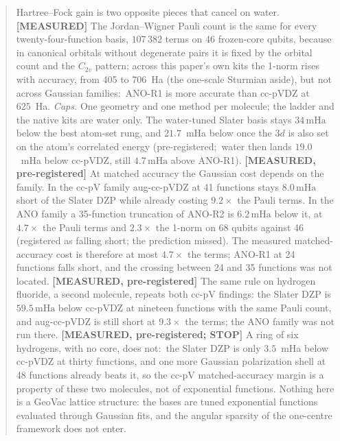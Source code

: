 \documentclass[aps,pra,twocolumn,superscriptaddress,longbibliography]{revtex4-2}
\newcommand{\gvq}[2]{#2}
\newcommand{\gvc}[2]{#2}
\newcommand{\mHa}{\,\mathrm{mHa}}
\begin{document}
\begin{abstract}
Hartree--Fock gain is two opposite pieces that cancel on water.
\textbf{[MEASURED]} The Jordan--Wigner Pauli count is the same for every
twenty-four-function basis, $\gvq{h2o_ccpvdz_pauli}{107\,382}$ terms on
46 frozen-core qubits, because in canonical orbitals without degenerate
pairs it is fixed by the orbital count and the $C_{2v}$ pattern; across
this paper's own kits the 1-norm rises with accuracy, from 405 to 706~Ha
(the one-scale Sturmian aside), but not across Gaussian families:\ ANO-R1
is more accurate than cc-pVDZ at 625~Ha.  \emph{Caps.}  One geometry and one method per molecule;
the ladder and the native kits are water only.
The water-tuned Slater basis stays $\gvq{p62_dzp_below_r5h_mha}{34}\mHa$
below the best atom-set rung, and $21.7$~mHa below once the $3d$ is also set
on the atom's correlated energy (pre-registered;\ water then lands $19.0$~mHa
below cc-pVDZ, still $\gvq{p62_r5h3d_above_anor1_mha}{4.7}\mHa$ above
ANO-R1).  \textbf{[MEASURED, pre-registered]} At matched accuracy the
Gaussian cost depends on the family.  In the cc-pV family aug-cc-pVDZ at
41 functions stays $\gvq{p62_aug_above_dzp_mha}{8.0}\mHa$ short of the
Slater DZP while already costing $\gvq{p62_aug_pauli_ratio}{9.2}\times$
the Pauli terms.  In the ANO family a 35-function truncation of ANO-R2
is $\gvq{p62_a35_below_dzp_mha}{6.2}\mHa$ below it, at
$\gvq{p62_a35_pauli_ratio}{4.7}\times$ the Pauli terms and
$\gvq{p62_a35_lambda_ratio}{2.3}\times$ the 1-norm on 68 qubits against
46 (registered as falling short; the prediction missed).  The measured
matched-accuracy cost is therefore at most $4.7\times$ the terms;
ANO-R1 at 24 functions falls short, and the crossing between 24 and 35
functions was not located.
\textbf{[MEASURED, pre-registered]} The same rule on hydrogen fluoride,
a second molecule, repeats both cc-pV findings: the Slater DZP is
$\gvq{p62_hf_dzp_vs_ccpvdz_mha}{59.5}\mHa$ below cc-pVDZ at nineteen
functions with the same Pauli count, and aug-cc-pVDZ is still short at
$\gvq{p62_hf_aug_pauli_ratio}{9.3}\times$ the terms; the ANO family was
not run there.
\textbf{[MEASURED, pre-registered; STOP]} A ring of six hydrogens, with no
core, does not:\ the Slater DZP is only $3.5$~mHa below cc-pVDZ at thirty
functions, and one more Gaussian polarization shell at 48 functions already
beats it, so \gvc{p62-hring-contrast}{the cc-pV matched-accuracy margin is a property of these two
molecules, not of exponential functions}.  Nothing here is a
GeoVac lattice structure: the
bases are tuned exponential functions evaluated through Gaussian fits,
and the angular sparsity of the one-centre framework does not enter.
\end{abstract}
\end{document}
